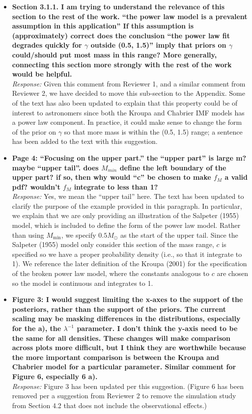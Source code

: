 \documentclass[11pt, oneside]{article}   	%
\newcommand{\Msun}{M_{\odot}}
\begin{document}
\begin{itemize}
\item  {\bf Section 3.1.1. I am trying to understand the relevance of this section to the rest of the work. ``the power law model is a prevalent assumption in this application'' If this assumption is (approximately) correct does the conclusion ``the power law fit degrades quickly for $\gamma$ outside (0.5, 1.5)'' imply that priors on $\gamma$ could/should put most mass in this range? More generally, connecting this section more strongly with the rest of the work would be helpful.} \\
\noindent \emph{Response:} Given this comment from Reviewer 1, and a similar comment from Reviewer 2, we have decided to move this sub-section to the Appendix.  Some of the text has also been updated to explain that this property could be of interest to astronomers since both the Kroupa and Chabrier IMF models has a power law component.  
In practice, it could make sense to change the form of the prior on $\gamma$ so that more mass is within the (0.5, 1.5) range; a sentence has been added to the text with this suggestion.
\bigskip

\item {\bf Page 4: ``Focusing on the upper part.'' the ``upper part'' is large m? maybe ``upper tail''. does $M_{min}$ define the left boundary of the upper part? if so, then why would ``c'' be chosen to make $f_M$ a valid pdf? wouldn't $f_M$ integrate to less than 1?} \\
\noindent \emph{Response:} Yes, we mean the ``upper tail'' here.  The text has been updated to clarify the purpose of the example provided in this paragraph.  In particular, we explain that we are only providing an illustration of the Salpeter (1955) model, which is included to define the form of the power law model.  Rather than using $M_{\min}$, we specify $0.5\Msun$ as the start of the upper tail.  Since the Salpeter (1955) model only consider this section of the mass range, $c$ is specified so we have a proper probability density (i.e., so that it integrate to 1).  We reference the later definition of the Kroupa (2001) for the specification of the broken power law model, where the constants analogous to $c$ are chosen so the model is continuous and integrates to 1.
\bigskip

\item {\bf Figure 3: I would suggest limiting the x-axes to the support of the posteriors, rather than the support of the priors. The current scaling may be masking differences in the
distributions, especially for the a), the $\lambda^{-1}$ parameter. I don't think the y-axis need to be the same for all densities. These changes will make comparison across plots more difficult, but I think they are worthwhile because the more important comparison is between the Kroupa and Chabrier model for a particular parameter. Similar comment for Figure 6, especially 6 a).} \\
\noindent \emph{Response:} Figure 3 has been updated per this suggestion.  (Figure 6 has been removed per a suggestion from Reviewer 2 to remove the simulation study from Section 4.2 that does not include the observational effects.)
\bigskip


\end{itemize}
\end{document}
